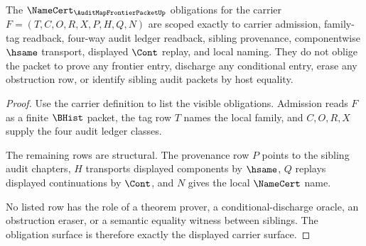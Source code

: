 \begin{theorem}
\label{thm:audit-map-frontier-packet-namecert-obligation-scope}
The $\NameCert_{\AuditMapFrontierPacketUp}$ obligations for the carrier $F=(T,C,O,R,X,P,H,Q,N)$ are scoped exactly to carrier admission, family-tag readback, four-way audit ledger readback, sibling provenance, componentwise $\hsame$ transport, displayed $\Cont$ replay, and local naming. They do not oblige the packet to prove any frontier entry, discharge any conditional entry, erase any obstruction row, or identify sibling audit packets by host equality.
\end{theorem}
\begin{proof}
Use the carrier definition to list the visible obligations. Admission reads $F$ as a finite $\BHist$ packet, the tag row $T$ names the local family, and $C,O,R,X$ supply the four audit ledger classes.

The remaining rows are structural. The provenance row $P$ points to the sibling audit chapters, $H$ transports displayed components by $\hsame$, $Q$ replays displayed continuations by $\Cont$, and $N$ gives the local $\NameCert$ name.

No listed row has the role of a theorem prover, a conditional-discharge oracle, an obstruction eraser, or a semantic equality witness between siblings. The obligation surface is therefore exactly the displayed carrier surface.
\end{proof}


\begin{closurestatus}{\AuditMapFrontierPacketUp}
  \theoryclosure{\obligationClosure}
  \formalstatus{\unformalizedV}
\end{closurestatus}
